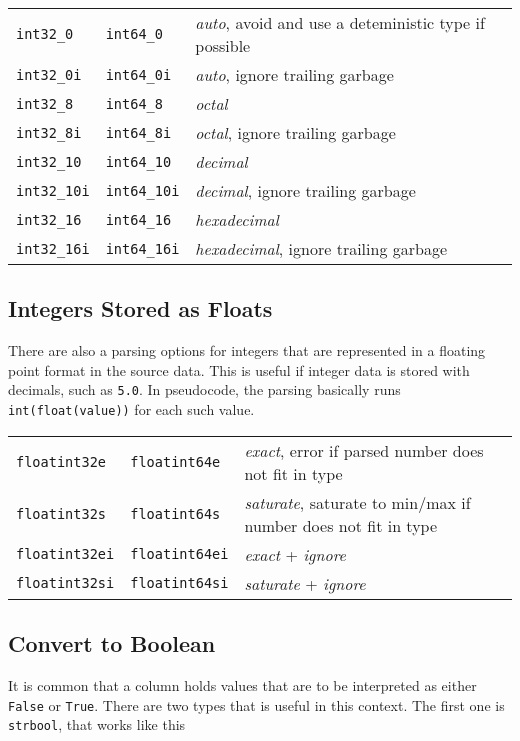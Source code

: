 \begin{tabular}{lll}
  \texttt{int32\_0}   & \texttt{int64\_0}   & \emph{auto}, avoid and use a deteministic type if possible \\
  \texttt{int32\_0i}  & \texttt{int64\_0i}  & \emph{auto}, ignore trailing garbage \\
  \texttt{int32\_8}   & \texttt{int64\_8}   & \emph{octal} \\
  \texttt{int32\_8i}  & \texttt{int64\_8i}  & \emph{octal}, ignore trailing garbage \\
  \texttt{int32\_10}  & \texttt{int64\_10}  & \emph{decimal} \\
  \texttt{int32\_10i} & \texttt{int64\_10i} & \emph{decimal}, ignore trailing garbage \\
  \texttt{int32\_16}  & \texttt{int64\_16}  & \emph{hexadecimal} \\
  \texttt{int32\_16i} & \texttt{int64\_16i} & \emph{hexadecimal}, ignore trailing garbage \\
\end{tabular}



\subsection{Integers Stored as Floats}

There are also a parsing options for integers that are represented in
a floating point format in the source data.  This is useful if integer
data is stored with decimals, such as \texttt{5.0}.  In pseudocode,
the parsing basically runs \texttt{int(float(value))} for each such
value.\\

\begin{tabular}{lll}
  \texttt{floatint32e} & \texttt{floatint64e}  & \emph{exact}, error if parsed number does not fit in type\\
  \texttt{floatint32s} & \texttt{floatint64s}  & \emph{saturate}, saturate to min/max if number does not fit in type\\
  \texttt{floatint32ei}& \texttt{floatint64ei} & \emph{exact} + \emph{ignore}\\
  \texttt{floatint32si}& \texttt{floatint64si} & \emph{saturate} + \emph{ignore}\\
\end{tabular}



\subsection{Convert to Boolean}
It is common that a column holds values that are to be interpreted as
either \texttt{False} or \texttt{True}.  There are two types that is
useful in this context.  The first one is \texttt{strbool}, that works like this\\

